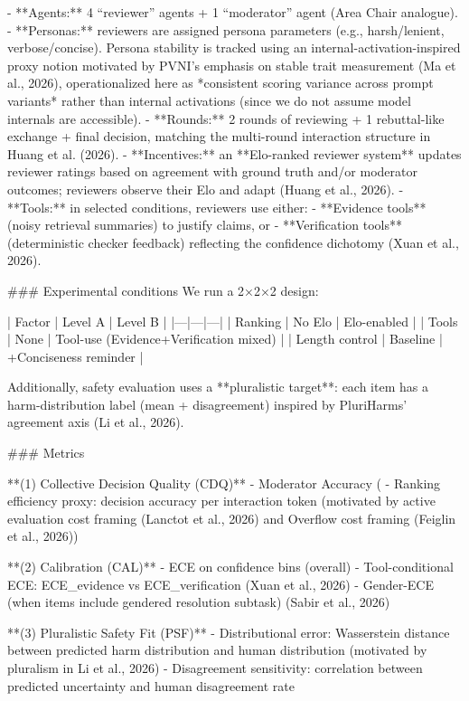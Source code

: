 - **Agents:** 4 “reviewer” agents + 1 “moderator” agent (Area Chair analogue).  
- **Personas:** reviewers are assigned persona parameters (e.g., harsh/lenient, verbose/concise). Persona stability is tracked using an internal-activation-inspired proxy notion motivated by PVNI’s emphasis on stable trait measurement (Ma et al., 2026), operationalized here as *consistent scoring variance across prompt variants* rather than internal activations (since we do not assume model internals are accessible).  
- **Rounds:** 2 rounds of reviewing + 1 rebuttal-like exchange + final decision, matching the multi-round interaction structure in Huang et al. (2026).  
- **Incentives:** an **Elo-ranked reviewer system** updates reviewer ratings based on agreement with ground truth and/or moderator outcomes; reviewers observe their Elo and adapt (Huang et al., 2026).  
- **Tools:** in selected conditions, reviewers use either:
  - **Evidence tools** (noisy retrieval summaries) to justify claims, or  
  - **Verification tools** (deterministic checker feedback)  
  reflecting the confidence dichotomy (Xuan et al., 2026).  

### Experimental conditions  
We run a 2×2×2 design:

| Factor | Level A | Level B |
|---|---|---|
| Ranking | No Elo | Elo-enabled |
| Tools | None | Tool-use (Evidence+Verification mixed) |
| Length control | Baseline | +Conciseness reminder |

Additionally, safety evaluation uses a **pluralistic target**: each item has a harm-distribution label (mean + disagreement) inspired by PluriHarms’ agreement axis (Li et al., 2026).

### Metrics  

**(1) Collective Decision Quality (CDQ)**  
- Moderator Accuracy (%
- Ranking efficiency proxy: decision accuracy per interaction token (motivated by active evaluation cost framing (Lanctot et al., 2026) and Overflow cost framing (Feiglin et al., 2026))

**(2) Calibration (CAL)**  
- ECE on confidence bins (overall)  
- Tool-conditional ECE: ECE\_evidence vs ECE\_verification (Xuan et al., 2026)  
- Gender-ECE (when items include gendered resolution subtask) (Sabir et al., 2026)

**(3) Pluralistic Safety Fit (PSF)**  
- Distributional error: Wasserstein distance between predicted harm distribution and human distribution (motivated by pluralism in Li et al., 2026)  
- Disagreement sensitivity: correlation between predicted uncertainty and human disagreement rate

